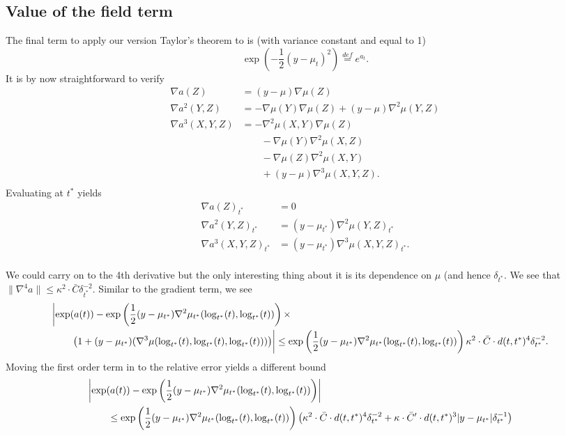 \documentclass{article}
\begin{document}
\subsection{Value of the field term}

The final term to apply our version Taylor's theorem to is (with variance constant and equal to 1)
$$
\exp\left(-\frac{1}{2}(y-\mu_t)^2\right) \overset{def}{=} e^{a_t}.
$$
It is by now straightforward to verify
$$
\begin{aligned}
\nabla a(Z) &= (y-\mu) \nabla \mu(Z)\\
\nabla a^2(Y, Z) &= -\nabla \mu(Y) \nabla \mu(Z) + (y-\mu) \nabla^2 \mu(Y, Z)\\
\nabla a^3(X, Y, Z) &= -\nabla^2 \mu(X, Y) \nabla \mu(Z)\\
& \qquad -\nabla \mu(Y) \nabla^2 \mu(X, Z) \\
& \qquad -\nabla \mu(Z) \nabla^2 \mu(X, Y) \\
& \qquad + (y - \mu) \nabla^3 \mu(X, Y, Z). \\
\end{aligned}
$$
Evaluating at $t^*$ yields
$$
\begin{aligned}
\nabla a(Z)_{t^*} &= 0 \\
\nabla a^2(Y, Z)_{t^*} &=  (y-\mu_{t^*}) \nabla^2 \mu(Y, Z)_{t^*}\\
\nabla a^3(X, Y, Z)_{t^*} &=   (y - \mu_{t^*}) \nabla^3 \mu(X, Y, Z)_{t^*}. \\
\end{aligned}
$$

We could carry on to the 4th derivative but the only interesting thing about it is its dependence on $\mu$ (and hence $\delta_{t^*}$. We see that $\|\nabla^4 a\| \leq \kappa^2 \cdot \bar{C} \delta_{t^*}^{-2}$.
Similar to the gradient term, we see
$$
\begin{aligned}
  \lefteqn{\biggl|\exp(a(t)) - \exp\left(\frac{1}{2}(y-\mu_{t^*}) \nabla^2 \mu_{t^*}(\log_{t^*}(t), \log_{t^*}(t))\right) \times} \\
  & \qquad \left(1 + (y - \mu_{t^*})( \nabla^3 \mu(\log_{t^*}(t), \log_{t^*}(t) ,\log_{t^*}(t))) \right)\biggr|
  \leq \exp\left(\frac{1}{2}(y-\mu_{t^*}) \nabla^2 \mu_{t^*}(\log_{t^*}(t), \log_{t^*}(t))\right) \kappa^2 \cdot \bar{C} \cdot d(t,t^*)^4 \delta_{t^*}^{-2}.
\end{aligned}
$$
Moving the first order term in to the relative error yields a different bound
$$
\begin{aligned}
  \lefteqn{\biggl|\exp(a(t)) - \exp\left(\frac{1}{2}(y-\mu_{t^*}) \nabla^2 \mu_{t^*}(\log_{t^*}(t), \log_{t^*}(t))\right)\biggr|} \\
  & \qquad 
  \leq \exp\left(\frac{1}{2}(y-\mu_{t^*}) \nabla^2 \mu_{t^*}(\log_{t^*}(t), \log_{t^*}(t))\right) \left(\kappa^2 \cdot \bar{C} \cdot d(t,t^*)^4 \delta_{t^*}^{-2} +  \kappa \cdot \bar{C}' \cdot d(t,t^*)^3 |y - \mu_{t^*}| \delta_{t^*}^{-1} \right)
\end{aligned}
$$
\end{document}

